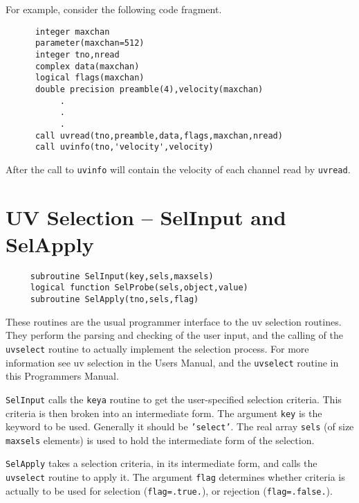 For example, consider the following code fragment.
\begin{verbatim}
      integer maxchan
      parameter(maxchan=512)
      integer tno,nread
      complex data(maxchan)
      logical flags(maxchan)
      double precision preamble(4),velocity(maxchan)
           .
           .
           .
      call uvread(tno,preamble,data,flags,maxchan,nread)
      call uvinfo(tno,'velocity',velocity)
\end{verbatim}
After the call to {\tt uvinfo} will contain the velocity of each channel
read by {\tt uvread}.

\section{UV Selection -- SelInput and SelApply}
\label{sect:select}
\begin{verbatim}
     subroutine SelInput(key,sels,maxsels)
     logical function SelProbe(sels,object,value)
     subroutine SelApply(tno,sels,flag)
\end{verbatim}
These routines are the usual programmer interface to the uv selection
routines. They perform the parsing and checking of the user input, and
the calling of the {\tt uvselect} routine to actually implement the
selection process. For
more information see uv selection in the Users Manual, and the {\tt uvselect}
routine in this Programmers Manual.

{\tt SelInput} calls the {\tt keya} routine to get the user-specified
selection criteria. This criteria is then broken into an intermediate form.
The argument {\tt key} is the keyword to be used. Generally it should be
{\tt 'select'}. The real array {\tt sels} (of size {\tt maxsels} elements)
is used to hold the intermediate form of the selection.

{\tt SelApply} takes a selection criteria, in its intermediate form, and
calls the {\tt uvselect} routine to apply it. The argument {\tt flag} determines
whether criteria is actually to be used for selection ({\tt flag=.true.}), or
rejection ({\tt flag=.false.}).


